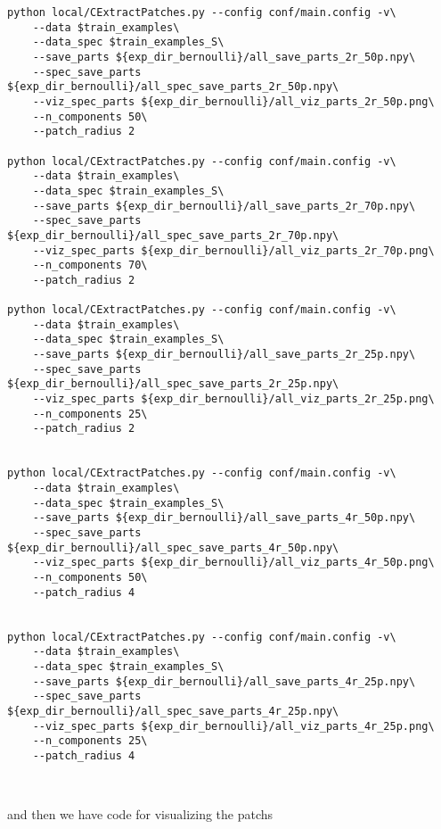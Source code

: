 \documentclass{article}
\begin{document}
\begin{verbatim}
python local/CExtractPatches.py --config conf/main.config -v\
    --data $train_examples\
    --data_spec $train_examples_S\
    --save_parts ${exp_dir_bernoulli}/all_save_parts_2r_50p.npy\
    --spec_save_parts ${exp_dir_bernoulli}/all_spec_save_parts_2r_50p.npy\
    --viz_spec_parts ${exp_dir_bernoulli}/all_viz_parts_2r_50p.png\
    --n_components 50\
    --patch_radius 2

python local/CExtractPatches.py --config conf/main.config -v\
    --data $train_examples\
    --data_spec $train_examples_S\
    --save_parts ${exp_dir_bernoulli}/all_save_parts_2r_70p.npy\
    --spec_save_parts ${exp_dir_bernoulli}/all_spec_save_parts_2r_70p.npy\
    --viz_spec_parts ${exp_dir_bernoulli}/all_viz_parts_2r_70p.png\
    --n_components 70\
    --patch_radius 2

python local/CExtractPatches.py --config conf/main.config -v\
    --data $train_examples\
    --data_spec $train_examples_S\
    --save_parts ${exp_dir_bernoulli}/all_save_parts_2r_25p.npy\
    --spec_save_parts ${exp_dir_bernoulli}/all_spec_save_parts_2r_25p.npy\
    --viz_spec_parts ${exp_dir_bernoulli}/all_viz_parts_2r_25p.png\
    --n_components 25\
    --patch_radius 2


python local/CExtractPatches.py --config conf/main.config -v\
    --data $train_examples\
    --data_spec $train_examples_S\
    --save_parts ${exp_dir_bernoulli}/all_save_parts_4r_50p.npy\
    --spec_save_parts ${exp_dir_bernoulli}/all_spec_save_parts_4r_50p.npy\
    --viz_spec_parts ${exp_dir_bernoulli}/all_viz_parts_4r_50p.png\
    --n_components 50\
    --patch_radius 4


python local/CExtractPatches.py --config conf/main.config -v\
    --data $train_examples\
    --data_spec $train_examples_S\
    --save_parts ${exp_dir_bernoulli}/all_save_parts_4r_25p.npy\
    --spec_save_parts ${exp_dir_bernoulli}/all_spec_save_parts_4r_25p.npy\
    --viz_spec_parts ${exp_dir_bernoulli}/all_viz_parts_4r_25p.png\
    --n_components 25\
    --patch_radius 4



\end{verbatim}
and then we have code for visualizing the patchs
\end{document}
